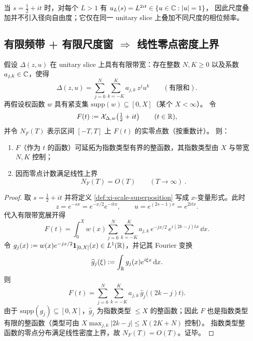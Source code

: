 \begin{remark}\label{rem:scale-superposition-unitary}
当 $s=\tfrac12+it$ 时，对每个 $L>1$ 有
$
u_L(s)=L^{2it}\in\{u\in\mathbb{C}:|u|=1\}
$，
因此尺度叠加并不引入径向自由度；它仅在同一 unitary slice 上叠加不同尺度的相位频率。
\end{remark}

\subsection{有限频带 + 有限尺度窗 $\Rightarrow$ 线性零点密度上界}\label{subsec:scale-superposition-zero-density}

\begin{proposition}[有限频带/有限尺度的零点密度上界：\texorpdfstring{$N(T)=O(T)$}{N(T)=O(T)}]\label{prop:scale-superposition-zero-density-upper}
假设 $\Delta(z,u)$ 在 unitary slice 上具有有限带宽：存在整数 $N,K\ge 0$ 以及系数 $a_{j,k}\in\mathbb{C}$，使得
$$
\Delta(z,u)=\sum_{j=0}^{N}\sum_{k=-K}^{K} a_{j,k}\,z^j u^k
\qquad(\text{有限和}).
$$
再假设权函数 $w$ 具有紧支集 $\mathrm{supp}(w)\subseteq [0,X]$（某个 $X<\infty$）。
令
$$
F(t):=\mathcal X_{\Delta,w}\!\left(\tfrac12+it\right)\qquad(t\in\mathbb{R}),
$$
并令 $N_F(T)$ 表示区间 $[-T,T]$ 上 $F(t)$ 的实零点数（按重数计）。
则：
\begin{enumerate}[label=(\arabic*), ref=\arabic*]
  \item $F$（作为 $t$ 的函数）可延拓为指数类型有界的整函数，其指数类型由 $X$ 与带宽 $N,K$ 控制；
  \item 因而零点计数满足线性上界
  $$
  \boxed{\ N_F(T)=O(T)\qquad(T\to\infty)\ }.
  $$
\end{enumerate}
\end{proposition}
\begin{proof}
取 $s=\tfrac12+it$ 并将定义 \ref{def:xi-scale-superposition} 写成 $x$-变量形式。此时
$$
z=e^{-sx}=e^{-x/2}e^{-itx},
\qquad
u=e^{(2s-1)x}=e^{2itx}.
$$
代入有限带宽展开得
$$
F(t)=\int_0^{X} w(x)\sum_{j=0}^{N}\sum_{k=-K}^{K} a_{j,k}\,e^{-jx/2}\,e^{i(2k-j)tx}\,\dd x.
$$
令 $g_j(x):=w(x)e^{-jx/2}\mathbf{1}_{[0,X]}(x)\in L^1(\mathbb{R})$，并记其 Fourier 变换
$$
\widehat g_j(\xi):=\int_{\mathbb{R}} g_j(x)e^{i\xi x}\,\mathrm{d} x.
$$
则
$$
F(t)=\sum_{j=0}^{N}\sum_{k=-K}^{K} a_{j,k}\,\widehat g_j\!\bigl((2k-j)t\bigr).
$$
由于 $\mathrm{supp}(g_j)\subseteq[0,X]$，$\widehat g_j$ 为指数类型 $\le X$ 的整函数；因此 $F$ 也是指数类型有限的整函数（类型可由 $X\max_{j,k}|2k-j|\le X(2K+N)$ 控制）。
指数类型整函数的零点分布满足线性密度上界，故 $N_F(T)=O(T)$。证毕。
\end{proof}

